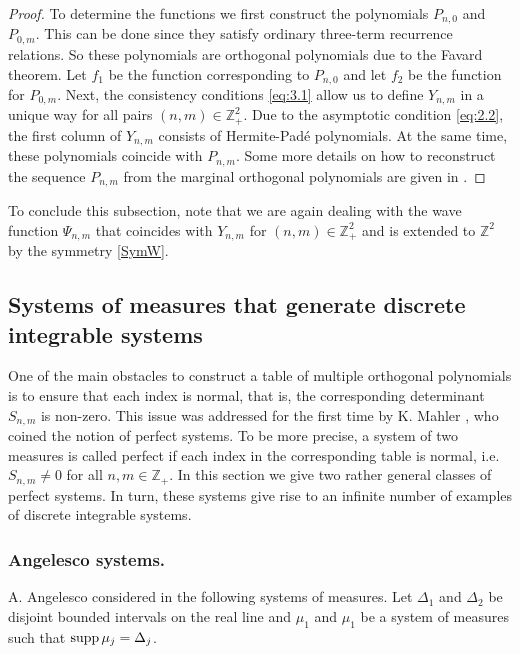 \documentclass{amsart}
\theoremstyle{remark}
\numberwithin{equation}{section}
\begin{document}
\begin{proof}
To determine the functions we first construct the polynomials $P_{n,0}$ and $P_{0,m}$. This can be done since they satisfy ordinary three-term recurrence relations.
So these polynomials are orthogonal polynomials due to the Favard theorem. Let $f_1$ be the function corresponding to $P_{n,0}$
and let $f_2$ be the function for $P_{0,m}$. Next, the  consistency conditions \eqref{eq:3.1}
allow us to define $Y_{n,m}$ in a unique way for all pairs $(n,m)\in{{\mathbb Z}}_+^2$. Due to the asymptotic condition \eqref{eq:2.2},
the first column of $Y_{n,m}$ consists of {Her\-mite-Pad\'e}{} polynomials. At the same time, these polynomials
coincide with $P_{n,m}$. Some more details on how to reconstruct the sequence $P_{n,m}$ from the marginal orthogonal
polynomials are given in \cite{FHVanA}.
\end{proof}

To conclude this subsection, note that we are again dealing with the wave function $\Psi_{n,m}$ that
coincides with $Y_{n,m}$ for $(n,m)\in{{\mathbb Z}}_+^2$ and is extended to ${{\mathbb Z}}^2$ by the symmetry \eqref{SymW}.

\subsection{Systems of measures that generate discrete integrable systems}\label{sec:43}

One of the main obstacles to construct a table of multiple orthogonal polynomials is to ensure that each index is normal, that is, the corresponding determinant $S_{n,m}$ is non-zero. This issue was addressed for the first time by K. Mahler \cite{Mah}, who coined the notion of perfect systems. 
To be more precise, a system of two measures is called perfect if each index in the corresponding table is normal, i.e. $S_{n,m}\ne 0$ for all $n,m\in{{\mathbb Z}}_+$. In this section we give two rather general classes of perfect systems. In turn, these systems give rise to an infinite number of examples of discrete integrable systems.

\subsubsection{Angelesco systems.} A. Angelesco considered in \cite{Ang} the following systems of measures. Let $\Delta_1$ and $\Delta_2$ be disjoint bounded intervals on the real line and $\mu_1$ and $\mu_1$ be a system of measures such that
${{\rm supp\,}} \mu_j = \Delta_j$.
\end{document}
